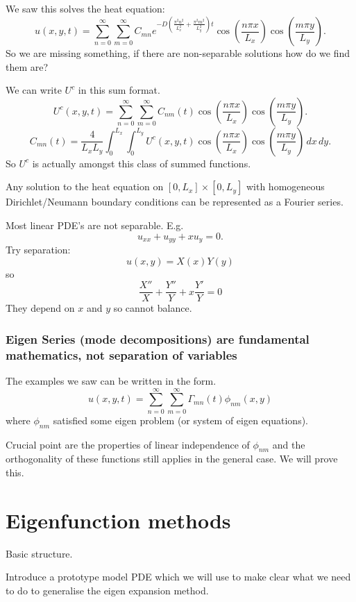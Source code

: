 \documentclass[10pt, a4paper]{article}
\begin{document}
We saw this solves the heat equation:
\[
u(x, y, t) = \sum_{n = 0}^{\infty}\sum_{m = 0}^{\infty}C_{mn}e ^ {-D\left(\frac{\pi ^ 2n ^ 2}{L_x ^ 2} + \frac{\pi ^ 2m ^ 2}{L_y ^ 2}\right)t}\cos\left(\frac{n\pi x}{L_x}\right)\cos\left(\frac{m\pi y}{L_y}\right).
\]
So we are missing something,
if there are non-separable solutions how do we find them are?

We can write $U ^ c$ in this sum format.
\[
U ^ c(x, y, t) = \sum_{n = 0}^{\infty}\sum_{m = 0}^{\infty}C_{nm}(t)\cos\left(\frac{n\pi x}{L_x}\right)\cos\left(\frac{m\pi y}{L_y}\right).
\]
\[
C_{mn}(t) = \frac{4}{L_xL_y}\int_{0}^{L_x}\int_{0}^{L_y}U ^ c(x, y, t)\cos\left(\frac{n\pi x}{L_x}\right)\cos\left(\frac{m\pi y}{L_y}\right)\,dx\,dy.
\]
So $U ^ c$ is actually amongst this class of summed functions.

\begin{proposition}
    Any solution to the heat equation on $[0, L_x] \times [0, L_y]$ with homogeneous Dirichlet/Neumann boundary conditions can be represented as a Fourier series.
\end{proposition}

Most linear PDE's are not separable.
E.g.
\[
u_{xx} + u_{yy} + xu_y = 0.
\]
Try separation:
\[
u(x, y) = X(x)Y(y)
\]
so
\[
\frac{X''}{X} + \frac{Y''}{Y} + x\frac{Y'}{Y} = 0
\]
They depend on $x$ and $y$ so cannot balance.

\subsubsection{Eigen Series
(mode decompositions)
are fundamental mathematics,
not separation of variables}

The examples we saw can be written in the form.
\[
u(x, y, t) = \sum_{n = 0}^{\infty}\sum_{m = 0}^{\infty}\Gamma_{mn}(t)\phi_{nm}(x, y)
\]
where $\phi_{nm}$ satisfied some eigen problem
(or system of eigen equations).

Crucial point are the properties of linear independence of $\phi_{nm}$ and the orthogonality of these functions still applies in the general case.
We will prove this.

\newpage

\section{Eigenfunction methods}
Basic structure.

Introduce a prototype model PDE which we will use to make clear what we need to do to generalise the eigen expansion method.
\end{document}
